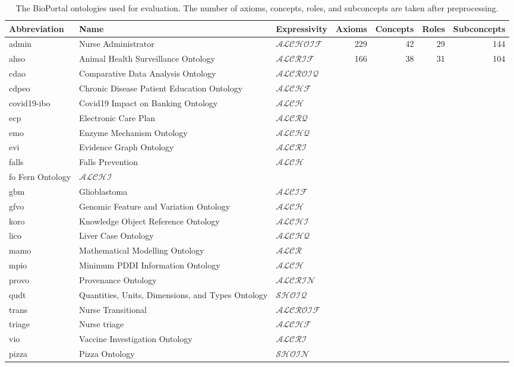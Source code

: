 \documentclass[
]{ceurart}
\begin{document}
\begin{table}
  \centering
  \begin{tabular}{|l l l r r r r|}
    \hline
    Abbreviation & Name & Expressivity & Axioms & Concepts & Roles & Subconcepts \\
    \hline
    admin & Nurse Administrator & $\mathcal{ALCHOIF}$ & 229 & 42 & 29 & 144 \\
    ahso & Animal Health Surveillance Ontology & $\mathcal{ALCRIF}$ & 166 & 38 & 31 & 104 \\
    cdao & Comparative Data Analysis Ontology & $\mathcal{ALCROIQ}$ & & & & \\
    cdpeo & Chronic Disease Patient Education Ontology & $\mathcal{ALCHF}$ & & & & \\
    covid19-ibo & Covid19 Impact on Banking Ontology & $\mathcal{ALCH}$ & & & & \\
    ecp & Electronic Care Plan & $\mathcal{ALCRQ}$ & & & & \\
    emo & Enzyme Mechanism Ontology & $\mathcal{ALCHQ}$ & & & & \\
    evi & Evidence Graph Ontology & $\mathcal{ALCRI}$ & & & & \\
    falls & Falls Prevention & $\mathcal{ALCH}$ & & & & \\
    fo Fern Ontology & $\mathcal{ALCHI}$ & & & & \\
    gbm & Glioblastoma & $\mathcal{ALCIF}$ & & & & \\
    gfvo & Genomic Feature and Variation Ontology & $\mathcal{ALCH}$ & & & & \\
    koro & Knowledge Object Reference Ontology & $\mathcal{ALCHI}$ & & & & \\
    lico & Liver Case Ontology & $\mathcal{ALCHQ}$ & & & & \\
    mamo & Mathematical Modelling Ontology & $\mathcal{ALCR}$ & & & & \\
    mpio & Minimum PDDI Information Ontology & $\mathcal{ALCH}$ & & & & \\
    provo & Provenance Ontology & $\mathcal{ALCRIN}$ & & & & \\
    qudt & Quantities, Units, Dimensions, and Types Ontology & $\mathcal{SHOIQ}$ & & & & \\
    trans & Nurse Transitional & $\mathcal{ALCROIF}$ & & & & \\
    triage & Nurse triage & $\mathcal{ALCHF}$ & & & & \\
    vio & Vaccine Investigation Ontology & $\mathcal{ALCRI}$ & & & & \\
    \hline
    pizza & Pizza Ontology & $\mathcal{SHOIN}$ & & & & \\
    \hline
  \end{tabular}
  \caption{The BioPortal ontologies used for evaluation. The number of axioms, concepts, roles, and subconcepts are taken after preprocessing.}
\end{table}
\end{document}
